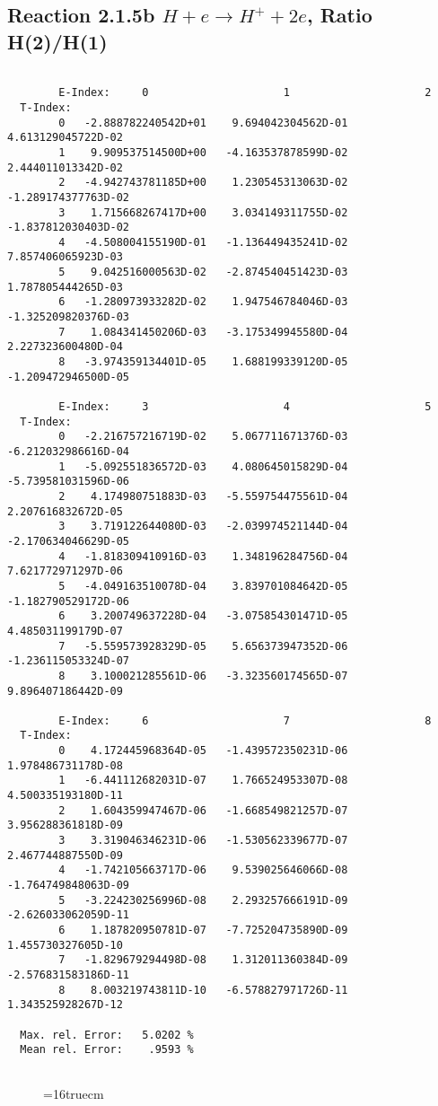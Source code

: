 \documentclass[12pt]{article}
\begin{document}
\newpage
\subsection{
Reaction 2.1.5b  $H + e \rightarrow H^+ + 2e$, Ratio H(2)/H(1)
}


\begin{small}\begin{verbatim}

        E-Index:     0                     1                     2
  T-Index:
        0   -2.888782240542D+01    9.694042304562D-01    4.613129045722D-02
        1    9.909537514500D+00   -4.163537878599D-02    2.444011013342D-02
        2   -4.942743781185D+00    1.230545313063D-02   -1.289174377763D-02
        3    1.715668267417D+00    3.034149311755D-02   -1.837812030403D-02
        4   -4.508004155190D-01   -1.136449435241D-02    7.857406065923D-03
        5    9.042516000563D-02   -2.874540451423D-03    1.787805444265D-03
        6   -1.280973933282D-02    1.947546784046D-03   -1.325209820376D-03
        7    1.084341450206D-03   -3.175349945580D-04    2.227323600480D-04
        8   -3.974359134401D-05    1.688199339120D-05   -1.209472946500D-05

        E-Index:     3                     4                     5
  T-Index:
        0   -2.216757216719D-02    5.067711671376D-03   -6.212032986616D-04
        1   -5.092551836572D-03    4.080645015829D-04   -5.739581031596D-06
        2    4.174980751883D-03   -5.559754475561D-04    2.207616832672D-05
        3    3.719122644080D-03   -2.039974521144D-04   -2.170634046629D-05
        4   -1.818309410916D-03    1.348196284756D-04    7.621772971297D-06
        5   -4.049163510078D-04    3.839701084642D-05   -1.182790529172D-06
        6    3.200749637228D-04   -3.075854301471D-05    4.485031199179D-07
        7   -5.559573928329D-05    5.656373947352D-06   -1.236115053324D-07
        8    3.100021285561D-06   -3.323560174565D-07    9.896407186442D-09

        E-Index:     6                     7                     8
  T-Index:
        0    4.172445968364D-05   -1.439572350231D-06    1.978486731178D-08
        1   -6.441112682031D-07    1.766524953307D-08    4.500335193180D-11
        2    1.604359947467D-06   -1.668549821257D-07    3.956288361818D-09
        3    3.319046346231D-06   -1.530562339677D-07    2.467744887550D-09
        4   -1.742105663717D-06    9.539025646066D-08   -1.764749848063D-09
        5   -3.224230256996D-08    2.293257666191D-09   -2.626033062059D-11
        6    1.187820950781D-07   -7.725204735890D-09    1.455730327605D-10
        7   -1.829679294498D-08    1.312011360384D-09   -2.576831583186D-11
        8    8.003219743811D-10   -6.578827971726D-11    1.343525928267D-12

  Max. rel. Error:   5.0202 %
  Mean rel. Error:    .9593 %


\end{verbatim}\end{small}
\begin{figure} \label{2.1.5b}
\epsfxsize=16truecm
\end{figure}
\end{document}
